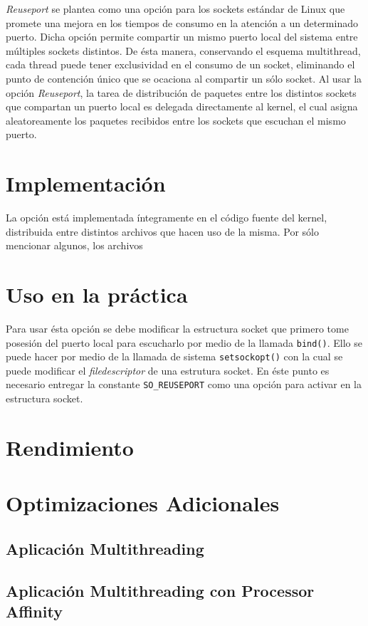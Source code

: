 \emph{Reuseport} se plantea como una opción para los sockets estándar de Linux que promete una mejora en los tiempos de consumo en la atención a un determinado puerto. Dicha opción permite compartir un mismo puerto local del sistema entre múltiples sockets distintos. De ésta manera, conservando el esquema multithread, cada thread puede tener exclusividad en el consumo de un socket, eliminando el punto de contención único que se ocaciona al compartir un sólo socket. Al usar la opción \emph{Reuseport}, la tarea de distribución de paquetes entre los distintos sockets que compartan un puerto local es delegada directamente al kernel, el cual asigna aleatoreamente los paquetes recibidos entre los sockets que escuchan el mismo puerto.

\section{Implementación}
La opción está implementada íntegramente en el código fuente del kernel, distribuida entre distintos archivos que hacen uso de la misma. Por sólo mencionar algunos, los archivos 


\section{Uso en la práctica}
Para usar ésta opción se debe modificar la estructura socket que primero tome posesión del puerto local para escucharlo por medio de la llamada \verb=bind()=. Ello se puede hacer por medio de la llamada de sistema \verb=setsockopt()= con la cual se puede modificar el \emph{filedescriptor} de una estrutura socket. En éste punto es necesario entregar la constante \verb=SO_REUSEPORT= como una opción para activar en la estructura socket.

\section{Rendimiento}


\section{Optimizaciones Adicionales}

\subsection{Aplicación Multithreading}

\subsection{Aplicación Multithreading con Processor Affinity}


